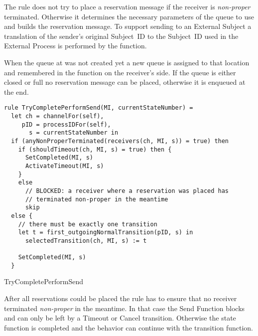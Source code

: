 The  rule does not try to place a reservation message if the receiver is \textit{non-proper} terminated. Otherwise it determines the necessary parameters of the queue to use and builds the reservation message. To support sending to an External Subject a translation of the sender's original Subject~ID to the Subject~ID used in the External Process is performed by the  function.

When the queue at  was not created yet a new queue is assigned to that location and remembered in the  function on the receiver's side. If the queue is either closed or full no reservation message can be placed, otherwise it is enqueued at the end.


\begin{listing}[htbp]
\begin{verbatim}
rule TryCompletePerformSend(MI, currentStateNumber) =
  let ch = channelFor(self),
     pID = processIDFor(self),
       s = currentStateNumber in
  if (anyNonProperTerminated(receivers(ch, MI, s)) = true) then
    if (shouldTimeout(ch, MI, s) = true) then {
      SetCompleted(MI, s)
      ActivateTimeout(MI, s)
    }
    else
      // BLOCKED: a receiver where a reservation was placed has
      // terminated non-proper in the meantime
      skip
  else {
    // there must be exactly one transition
    let t = first_outgoingNormalTransition(pID, s) in
      selectedTransition(ch, MI, s) := t

    SetCompleted(MI, s)
  }
\end{verbatim}
\caption{TryCompletePerformSend}
\label{lst:shortasm:TryCompletePerformSend}
\end{listing}


After all reservations could be placed the  rule has to ensure that no receiver terminated \textit{non-proper} in the meantime. In that case the Send Function blocks and can only be left by a Timeout or Cancel transition. Otherwise the state function is completed and the behavior can continue with the transition function.


